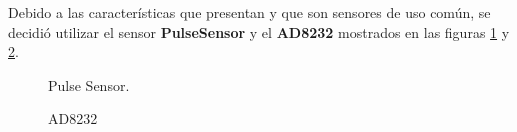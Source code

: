 Debido a las características que presentan y que son sensores de uso común, se decidió utilizar el sensor \textbf{PulseSensor} y el \textbf{AD8232} mostrados en las figuras \ref{fig:AnalisispulseSensor} y \ref{fig:AnalisisAD8232}. \\

		\begin{figure}[htbp!]
			\centering
			\caption{Pulse Sensor.}
			\label{fig:AnalisispulseSensor}
		\end{figure}

		\begin{figure}[htbp!]
			\centering
			\caption{AD8232}
			\label{fig:AnalisisAD8232}
		\end{figure}
\pagebreak